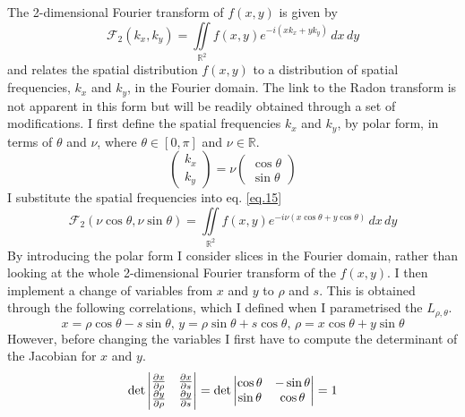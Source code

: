 \documentclass[12pt]{article}
\begin{document}
 The 2-dimensional Fourier transform of $f(x,y)$ is given by
\begin{equation}\label{eq.15}
	\mathcal{F}_2(k_x, k_y) = \iint\limits_{\mathbb{R}^2} f(x,y)e^{-i(xk_x+ yk_y)} \, dx \, dy
\end{equation}
and relates the spatial distribution $f(x,y)$ to a distribution of spatial frequencies, $k_x$ and $k_y$, in the Fourier domain. The link to the Radon transform is not apparent in this form but will be readily obtained through a set of modifications. I first define the spatial frequencies $k_x$ and $k_y$, by polar form, in terms of $\theta$ and $\nu$, where $\theta \in [0, \pi]$ and $\nu \in \mathbb{R}$.
\begin{equation}\label{eq.16}
\begin{pmatrix} k_x \\ k_y \end{pmatrix} = \nu\begin{pmatrix} \cos{\theta} \\ \sin{\theta} \end{pmatrix}
\end{equation}
I substitute the spatial frequencies into eq. \ref{eq.15}
\begin{equation}\label{eq.17}
	\mathcal{F}_2(\nu\cos{\theta}, \nu\sin{\theta}) = \iint\limits_{\mathbb{R}^2} f(x,y)e^{-i\nu(x\cos{\theta} + y\cos{\theta})} \, dx \, dy
\end{equation}
By introducing the polar form I consider slices in the Fourier domain, rather than looking at the whole 2-dimensional Fourier transform of the $f(x,y)$. I then implement a change of variables from $x$ and $y$ to $\rho$ and $s$. This is obtained through the following correlations, which I defined when I parametrised the $L_{\rho, \theta}$.
\begin{equation}\label{eq.18}
	x = \rho\cos{\theta} - s\sin{\theta}, \, y = \rho\sin{\theta} + s\cos{\theta},\, \rho = x\cos{\theta} + y\sin{\theta}
\end{equation}
However, before changing the variables I first have to compute the determinant of the Jacobian for $x$ and $y$.
\begin{equation}\label{eq.19}
	\rm{det}\begin{vmatrix}
\frac{\partial x}{\partial \rho} & \frac{\partial x}{\partial s} \\
\frac{\partial y}{\partial \rho} & \frac{\partial y}{\partial s} \\
\end{vmatrix}
= 
\rm{det}\begin{vmatrix}
\cos{\theta} & -\sin{\theta} \\
\sin{\theta} & \cos{\theta} \\
\end{vmatrix}
= 1
\end{equation}
\end{document}
